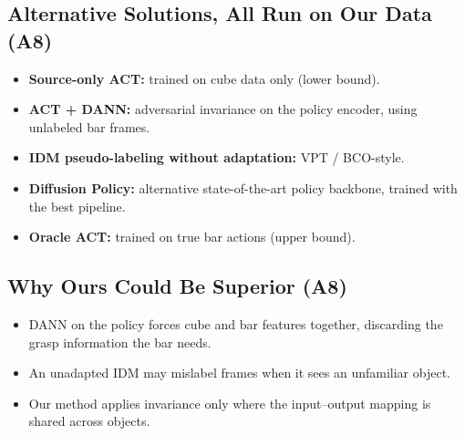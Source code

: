 \documentclass[11pt]{article}
\begin{document}
\subsection{Alternative Solutions, All Run on Our Data (A8)}
\begin{itemize}
  \item \textbf{Source-only ACT:} trained on cube data only (lower bound).
  \item \textbf{ACT + DANN:} adversarial invariance on the policy encoder,
    using unlabeled bar frames.
  \item \textbf{IDM pseudo-labeling without adaptation:} VPT / BCO-style.
  \item \textbf{Diffusion Policy:} alternative state-of-the-art policy
    backbone, trained with the best pipeline.
  \item \textbf{Oracle ACT:} trained on true bar actions (upper bound).
\end{itemize}

\subsection{Why Ours Could Be Superior (A8)}
\begin{itemize}
  \item DANN on the policy forces cube and bar features together, discarding
    the grasp information the bar needs.
  \item An unadapted IDM may mislabel frames when it sees an unfamiliar object.
  \item Our method applies invariance only where the input--output mapping is
    shared across objects.
\end{itemize}

\end{document}
